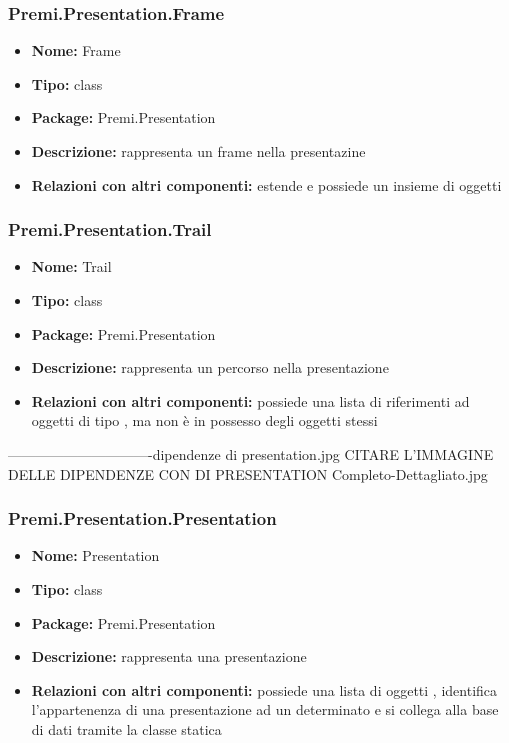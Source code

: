 \subsubsection{Premi.Presentation.Frame}
\begin{itemize}
  \item \textbf{Nome:} Frame
  \item \textbf{Tipo:} class
  \item \textbf{Package:} Premi.Presentation
  \item \textbf{Descrizione:} rappresenta un frame nella presentazine
  \item \textbf{Relazioni con altri componenti:} estende  e possiede un insieme di oggetti  
\end{itemize}
\subsubsection{Premi.Presentation.Trail}
\begin{itemize}
  \item \textbf{Nome:} Trail
  \item \textbf{Tipo:} class
  \item \textbf{Package:} Premi.Presentation
  \item \textbf{Descrizione:} rappresenta un percorso nella presentazione
  \item \textbf{Relazioni con altri componenti:} possiede una lista di riferimenti ad oggetti di tipo , ma non è in possesso degli oggetti stessi
\end{itemize}
-------------------------------dipendenze di presentation.jpg CITARE L'IMMAGINE DELLE DIPENDENZE CON DI PRESENTATION
Completo-Dettagliato.jpg
\subsubsection{Premi.Presentation.Presentation}
\begin{itemize}
  \item \textbf{Nome:} Presentation
  \item \textbf{Tipo:} class
  \item \textbf{Package:} Premi.Presentation
  \item \textbf{Descrizione:} rappresenta una presentazione
  \item \textbf{Relazioni con altri componenti:} possiede una lista di oggetti , identifica l'appartenenza di una presentazione ad un determinato  e si collega alla base di dati tramite la classe statica 
\end{itemize}



